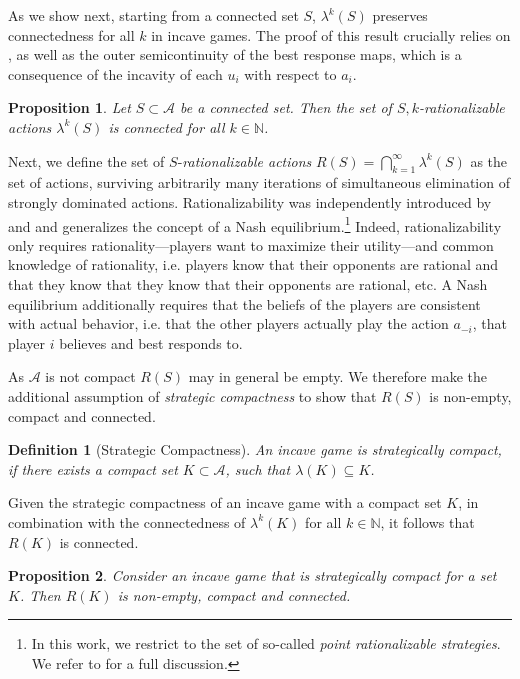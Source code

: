 \documentclass{article}
\newtheorem{definition}{Definition}[section]
\newtheorem{prop}{Proposition}
\newcommand{\N}{\mathbb{N}}
\begin{document}
As we show next, starting from a connected set $S$, $\lambda^k(S)$ preserves connectedness for all $k$ in incave games. The proof of this result crucially relies on , as well as the outer semicontinuity of the best response maps, which is a consequence of the incavity of each $u_i$ with respect to $a_i$.

\begin{prop}
    \label{prop:connected_k_rationalizable}
    Let $S \subset \mathcal{A}$ be a connected set. Then the set of $S,k$-rationalizable actions $\lambda^k(S)$ is connected for all $k\in \N$.
\end{prop}



Next, we define the set of $S$-\emph{rationalizable actions} $R(S)=\bigcap_{k=1}^\infty \lambda^k(S)$ as the set of actions, surviving arbitrarily many iterations of simultaneous elimination of strongly dominated actions. Rationalizability was independently introduced by \citet{Bernheim1984Rationalizable} and \citet{Pearce1984Rationalizable} and generalizes the concept of a Nash equilibrium.\footnote{In this work, we restrict to the set of so-called \emph{point rationalizable strategies}. We refer to \citet{Bernheim1984Rationalizable} for a full discussion.} Indeed, rationalizability only requires rationality---players want to maximize their utility---and common knowledge of rationality, i.e. players know that their opponents are rational and that they know that they know that their opponents are rational, etc. A Nash equilibrium additionally requires that the beliefs of the players are consistent with actual behavior, i.e. that the other players actually play the action $a_{-i}$, that player $i$ believes and best responds to.

As $\mathcal{A}$ is not compact $R(S)$ may in general be empty. We therefore make the additional assumption of \emph{strategic compactness} to show that $R(S)$ is non-empty, compact and connected.

\begin{definition}[Strategic Compactness]
    \label{def:strategic_compactness}
    An incave game is strategically compact, if there exists a compact set $K\subset \mathcal{A}$, such that $\lambda(K)\subseteq K$. 
\end{definition} 
Given the strategic compactness of an incave game with a compact set $K$, in combination with the connectedness of $\lambda^k(K)$ for all $k\in \N$, it follows that $R(K)$ is connected.
\begin{prop}
    \label{prop:connected_rationalizable}
    Consider an incave game that is strategically compact for a set $K$. Then $R(K)$ is non-empty, compact and connected.
\end{prop}
\end{document}
